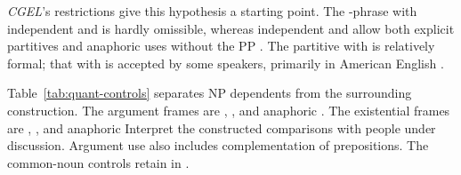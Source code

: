 \documentclass[12pt]{article}
\begin{document}
\textit{CGEL}'s restrictions give this hypothesis a starting point. The -phrase with independent  and  is hardly omissible, whereas independent  and  allow both explicit partitives and anaphoric uses without the PP \citep[392, 411--413]{huddleston2002}. The partitive with  is relatively formal; that with  is accepted by some speakers, primarily in American English \citep[393]{huddleston2002}.

Table~\ref{tab:quant-controls} separates NP dependents from the surrounding construction. The argument frames are , , and anaphoric . The existential frames are , , and anaphoric  Interpret the constructed comparisons with people under discussion. Argument use also includes complementation of prepositions. The common-noun controls retain  in .
\end{document}
